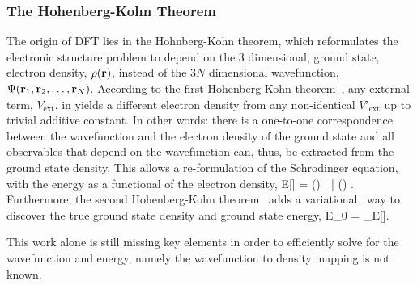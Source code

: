 \subsubsection{The Hohenberg-Kohn Theorem}
The origin  of DFT lies in the Hohnberg-Kohn theorem, which reformulates the electronic structure problem to depend on the $3$ dimensional, ground state, electron density, $\rho({\mathrm{\mathbf{\bm{r}}}})$, instead of the $3N$ dimensional wavefunction, $\Psi({\mathrm{\mathbf{\bm{r}}}}_1, {\mathrm{\mathbf{\bm{r}}}}_2, \ldots, {\mathrm{\mathbf{\bm{r}}}}_N)$.
According to the first Hohenberg-Kohn theorem~\cite{hohenberg-kohn-1964}, any external term, $V_\text{ext}$, in  yields a different electron density from any non-identical $V'_\text{ext}$ up to trivial additive constant.
In other words: there is a one-to-one correspondence between the wavefunction and the electron density of the ground state and all observables that depend on the wavefunction can, thus, be extracted from the ground state density.
This allows a re-formulation of the Schrodinger equation, with the energy as a functional of the electron density, 
E[\rho] = \bra \Psi(\rho) |  | \Psi(\rho) \ket.
\eeq
Furthermore, the second Hohenberg-Kohn theorem~\cite{hohenberg-kohn-1964} adds a variational~\cite{variational-rayleigh-1870, variational-ritz-1909} way to discover the true ground state density and ground state energy,
E_0 = \min_\rho E[\rho].
\eeq

This work alone is still missing key elements in order to efficiently solve for the wavefunction and energy, namely the wavefunction to density mapping is not known.

